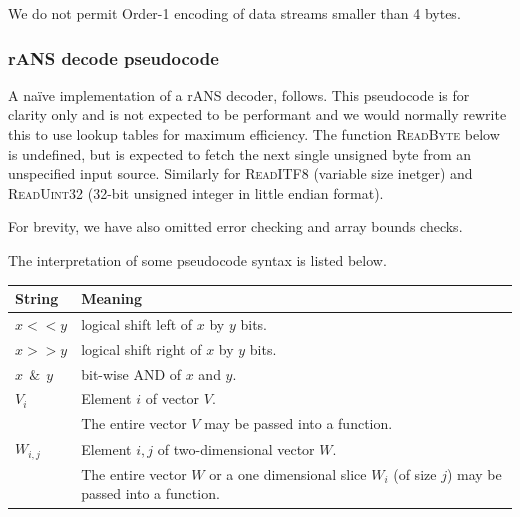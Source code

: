 \documentclass[a4paper]{article}
\begin{document}
We do not permit Order-1 encoding of data streams smaller than 4
bytes.

\newpage
\subsubsection*{rANS decode pseudocode}

A na\"ive implementation of a rANS decoder, follows.
This pseudocode is for clarity only and is not expected to be performant and we would normally rewrite this to use lookup tables for maximum efficiency.
The function \textsc{ReadByte} below is undefined, but is expected to fetch the next single unsigned byte from an unspecified input source.  Similarly for \textsc{ReadITF8} (variable size inetger) and \textsc{ReadUint32} (32-bit unsigned integer in little endian format).

For brevity, we have also omitted error checking and array bounds checks.

The interpretation of some pseudocode syntax is listed below.

\begin{tabular}{ll}
\textbf{String} & \textbf{Meaning} \\
\hline
$x << y$ & logical shift left of $x$ by $y$ bits. \\
$x >> y$ & logical shift right of $x$ by $y$ bits.\\
$x\ \ \&\ \ y$ & bit-wise AND of $x$ and $y$.\\
$V_i$ & Element $i$ of vector $V$.\\
      & The entire vector $V$ may be passed into a function.\\
$W_{i,j}$ & Element $i,j$ of two-dimensional vector $W$.\\
          & The entire vector $W$ or a one dimensional slice $W_i$ (of size $j$) may be passed into a function.\\
\end{tabular}

\vskip 0.5cm

\begin{algorithmic}[1]
\settowidth{\maxwidth}{$n\_out$}
\State {} 
\State {} 
\State {} 
\State {}
  \State {}
\Else
  \State {}
\EndIf
\EndProcedure
\end{algorithmic}
\end{document}
